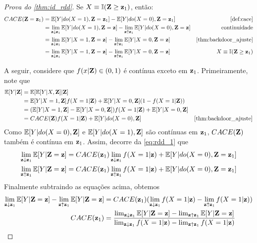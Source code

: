 \begin{proof}[Prova do \cref{thm:id_rdd}]
 Se $X \equiv {\mathbb I}({\mathbf{Z}} \geq {\mathbf{z}}_1)$, então:
 \begin{align*}
  \CACE(\Z=\z_1)
  &= \E[Y|do(X=1),\Z=\z_1] - \E[Y|do(X=0),\Z=\z_1] 
  & \text{\cref{def:cace}} \\
  &= \lim_{\z \downarrow \z_1} \E[Y|do(X=1),\Z=\z] 
  - \lim_{\z \uparrow \z_1}\E[Y|do(X=0),\Z=\z]
  & \text{continuidade} \\
  &= \lim_{\z \downarrow \z_1} \E[Y|X=1,\Z=\z] 
  - \lim_{\z \uparrow \z_1}\E[Y|X=0,\Z=\z]
  & \text{\cref{thm:backdoor_ajuste}} \\
  &= \lim_{\z \downarrow \z_1} \E[Y|X=1,\Z=\z] 
  - \lim_{\z \uparrow \z_1}\E[Y|X=0,\Z=\z]
  & X \equiv \I(\Z \geq \z_1)
 \end{align*}
 
 A seguir, considere que
 $f(x|{\mathbf{Z}}) \in (0,1)$ é contínua exceto em ${\mathbf{z}}_1$.
 Primeiramente, note que
 \begin{align}
  \label{eq:rdd_1}
  \E[Y|\Z] 
  &= \E[\E[Y|X,\Z]|\Z] \nonumber \\
  &= \E[Y|X=1,\Z]f(X=1|\Z) + \E[Y|X=0,\Z](1-f(X=1|\Z)) \nonumber \\
  &= (\E[Y|X=1,\Z]-\E[Y|X=0,\Z])f(X=1|\Z) + \E[Y|X=0,\Z] \nonumber \\
  &= \CACE(\Z)f(X=1|\Z) + \E[Y|do(X=0),\Z]
  & \text{\cref{thm:backdoor_ajuste}}
 \end{align}
 Como ${\mathbb E}[Y|do(X=0),{\mathbf{Z}}]$ e ${\mathbb E}[Y|do(X=1),{\mathbf{Z}}]$ são contínuas em ${\mathbf{z}}_1$,
 ${CACE}({\mathbf{Z}})$ também é contínua em ${\mathbf{z}}_1$. Assim, 
 decorre da \cref{eq:rdd_1} que
 \begin{align*}
  \lim_{{\mathbf{z}} \downarrow {\mathbf{z}}_1}{\mathbb E}[Y|{\mathbf{Z}}={\mathbf{z}}]
  &= {CACE}({\mathbf{z}}_1)\lim_{{\mathbf{z}} \downarrow {\mathbf{z}}_1} f(X=1|{\mathbf{z}}) + {\mathbb E}[Y|do(X=0),{\mathbf{Z}}={\mathbf{z}}_1] \\
  \lim_{{\mathbf{z}} \uparrow {\mathbf{z}}_1}{\mathbb E}[Y|{\mathbf{Z}}={\mathbf{z}}]
  &= {CACE}({\mathbf{z}}_1)\lim_{{\mathbf{z}} \uparrow {\mathbf{z}}_1} f(X=1|{\mathbf{z}}) + {\mathbb E}[Y|do(X=0),{\mathbf{Z}}={\mathbf{z}}_1] \\
 \end{align*}
 Finalmente subtraindo as equações acima, obtemos
 \begin{align*}
  \lim_{{\mathbf{z}} \downarrow {\mathbf{z}}_1}{\mathbb E}[Y|{\mathbf{Z}}={\mathbf{z}}] - \lim_{{\mathbf{z}} \uparrow {\mathbf{z}}_1}{\mathbb E}[Y|{\mathbf{Z}}={\mathbf{z}}]
  &= {CACE}({\mathbf{z}}_1)(\lim_{{\mathbf{z}} \downarrow {\mathbf{z}}_1} f(X=1|{\mathbf{z}}) - \lim_{{\mathbf{z}} \uparrow {\mathbf{z}}_1} f(X=1|{\mathbf{z}})) \\
  {CACE}({\mathbf{z}}_1) 
  &= \frac{\lim_{{\mathbf{z}} \downarrow {\mathbf{z}}_1}{\mathbb E}[Y|{\mathbf{Z}}={\mathbf{z}}] - \lim_{{\mathbf{z}} \uparrow {\mathbf{z}}_1}{\mathbb E}[Y|{\mathbf{Z}}={\mathbf{z}}]}
  {\lim_{{\mathbf{z}} \downarrow {\mathbf{z}}_1} f(X=1|{\mathbf{z}}) - \lim_{{\mathbf{z}} \uparrow {\mathbf{z}}_1} f(X=1|{\mathbf{z}})}
 \end{align*}
\end{proof}

